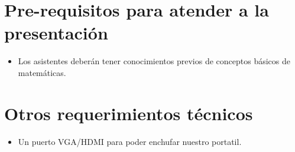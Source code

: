 \documentclass[runningheads]{llncs}
\begin{document}
\section{Pre-requisitos para atender a la presentación}
\begin{itemize}
\item  Los asistentes deber\'an tener conocimientos previos de conceptos básicos de matemáticas. 
\end{itemize}

\section{Otros requerimientos t\'ecnicos}
\begin{itemize}
 \item Un puerto VGA/HDMI para poder enchufar nuestro portatil.
\end{itemize}

\clearpage



\end{document}

